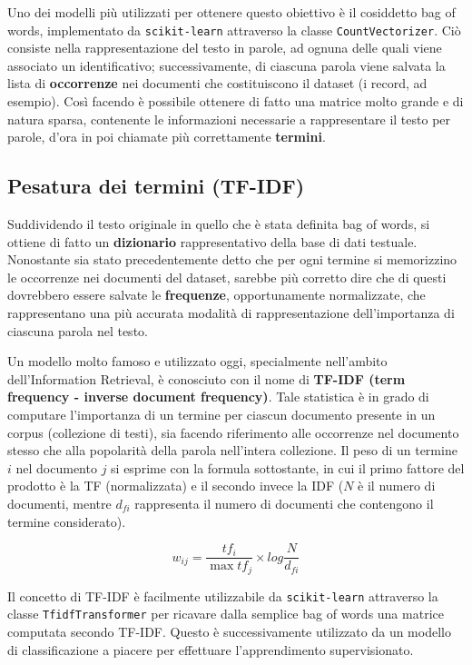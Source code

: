\documentclass[hidelinks, 12pt]{article}
\begin{document}
Uno dei modelli più utilizzati per ottenere questo obiettivo è il cosiddetto bag of words, implementato da \texttt{scikit-learn} attraverso la classe \texttt{CountVectorizer}. Ciò consiste nella rappresentazione del testo in parole, ad ognuna delle quali viene associato un identificativo; successivamente, di ciascuna parola viene salvata la lista di \textbf{occorrenze} nei documenti che costituiscono il dataset (i record, ad esempio). Così facendo è possibile ottenere di fatto una matrice molto grande e di natura sparsa, contenente le informazioni necessarie a rappresentare il testo per parole, d'ora in poi chiamate più correttamente \textbf{termini}.


\pagebreak


\subsection{Pesatura dei termini (TF-IDF)}

Suddividendo il testo originale in quello che è stata definita bag of words, si ottiene di fatto un \textbf{dizionario} rappresentativo della base di dati testuale. Nonostante sia stato precedentemente detto che per ogni termine si memorizzino le occorrenze nei documenti del dataset, sarebbe più corretto dire che di questi dovrebbero essere salvate le \textbf{frequenze}, opportunamente normalizzate, che rappresentano una più accurata modalità di rappresentazione dell'importanza di ciascuna parola nel testo.

Un modello molto famoso e utilizzato oggi, specialmente nell'ambito dell'Information Retrieval, è conosciuto con il nome di \textbf{TF-IDF (term frequency - inverse document frequency)}. Tale statistica è in grado di computare l'importanza di un termine per ciascun documento presente in un corpus (collezione di testi), sia facendo riferimento alle occorrenze nel documento stesso che alla popolarità della parola nell'intera collezione. Il peso di un termine $i$ nel documento $j$ si esprime con la formula sottostante, in cui il primo fattore del prodotto è la TF (normalizzata) e il secondo invece la IDF ($N$ è il numero di documenti, mentre \(d_{fi}\) rappresenta il numero di documenti che contengono il termine considerato).

\[ w_{ij} = \frac{tf_{i}}{\max tf_{j}} \times log\frac{N}{d_{fi}} \]

Il concetto di TF-IDF è facilmente utilizzabile da \texttt{scikit-learn} attraverso la classe \texttt{TfidfTransformer} per ricavare dalla semplice bag of words una matrice computata secondo TF-IDF. Questo è successivamente utilizzato da un modello di classificazione a piacere per effettuare l'apprendimento supervisionato.
\end{document}
